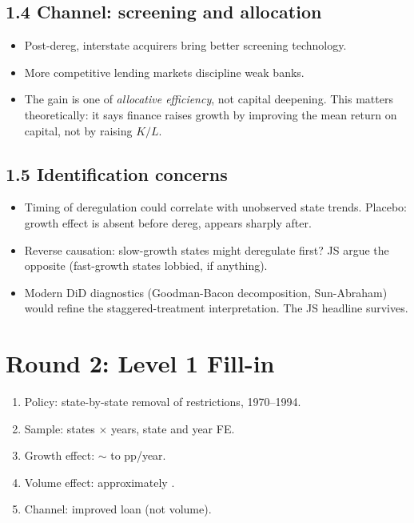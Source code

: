 \documentclass[11pt]{article}
\newcommand{\blank}[1]{\underline{\hspace{#1}}}
\begin{document}
\subsection*{1.4 Channel: screening and allocation}
\begin{itemize}
\item Post-dereg, interstate acquirers bring better screening technology.
\item More competitive lending markets discipline weak banks.
\item The gain is one of \emph{allocative efficiency}, not capital deepening. This matters theoretically: it says finance raises growth by improving the mean return on capital, not by raising $K/L$.
\end{itemize}

\subsection*{1.5 Identification concerns}
\begin{alertbox}
\begin{itemize}
\item Timing of deregulation could correlate with unobserved state trends. Placebo: growth effect is absent before dereg, appears sharply after.
\item Reverse causation: slow-growth states might deregulate first? JS argue the opposite (fast-growth states lobbied, if anything).
\item Modern DiD diagnostics (Goodman-Bacon decomposition, Sun-Abraham) would refine the staggered-treatment interpretation. The JS headline survives.
\end{itemize}
\end{alertbox}

\section*{Round 2: Level 1 Fill-in}
\begin{enumerate}
\item Policy: state-by-state removal of \blank{2cm} restrictions, 1970--1994.
\item Sample: \blank{1cm} states $\times$ \blank{1cm} years, state and year FE.
\item Growth effect: $\sim$\blank{1cm} to \blank{1cm} pp/year.
\item Volume effect: approximately \blank{1cm}.
\item Channel: improved loan \blank{2cm} (not volume).
\end{enumerate}
\end{document}

